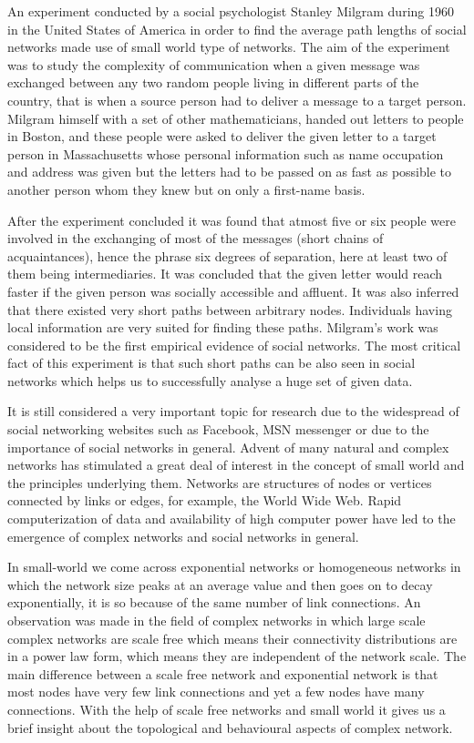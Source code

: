 An experiment conducted by a social psychologist Stanley Milgram during 1960 in the United States of America in order to find the average path lengths of social networks made use of small world type of networks. The aim of the experiment was to study the complexity of communication when a given message was exchanged between any two random people living in different parts of the country, that is
when a source person had to deliver a message to a target person. Milgram himself with a set of other mathematicians, handed out letters to people in Boston, and these people were asked to deliver the given letter to a target person in Massachusetts whose personal information such as name occupation and address was given but the letters had to be passed on as fast as possible to another person whom they knew but on only a first-name basis. 

After the experiment concluded it was found that atmost five or six people were involved in the exchanging of most of the messages (short chains of acquaintances), hence the phrase six degrees of separation, here at least two of them being intermediaries. It was concluded that the given letter would reach faster if the given person was socially accessible and affluent. It was also inferred that there existed very short paths between arbitrary nodes. Individuals having local information are very suited for finding these paths. Milgram’s work was considered to be the first empirical evidence of social networks. The most critical fact of this experiment is that such short paths can be also seen in social networks which helps us to successfully analyse a huge set of given data.

It is still considered a very important topic for research due to the widespread of social networking websites such as Facebook, MSN messenger or due to the importance of social networks in general. Advent of many natural and complex networks has stimulated a great deal of interest in the concept of small world and the principles underlying them. Networks are structures of nodes or vertices connected by links or edges, for example, the World Wide Web. Rapid computerization of data and availability of high computer power have led to the emergence of complex networks and social networks in general.

In small-world we come across exponential networks or homogeneous networks in which the network size peaks at an average value and then goes on to decay exponentially, it is so because of the same number of link connections. An observation was made in the field of complex networks in which large scale complex networks are scale free which means their connectivity distributions are in a power law form, which means they are independent of the network scale. The main difference between a scale free network and exponential network is that most nodes have very few link connections and yet a few nodes have many connections. With the help of scale free networks and small world it gives us a brief insight about the topological and behavioural aspects of complex network.  

